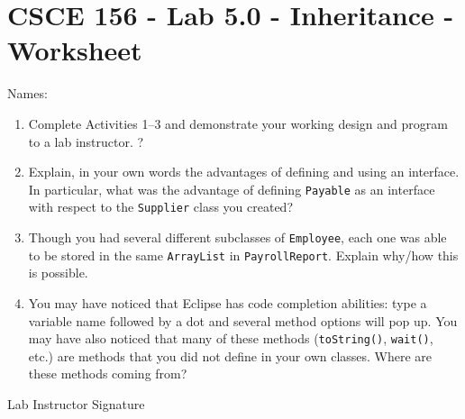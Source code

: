 \documentclass[12pt]{scrartcl}
\begin{document}
\section*{CSCE 156 - Lab 5.0 - Inheritance - Worksheet}

Names: \underline{\hspace{10cm}}

\begin{enumerate}
  \item Complete Activities 1--3 and demonstrate your working design 
  and program to a lab instructor. 
  ?  \item Explain, in your own words the advantages of defining and using 
  an interface.  In particular, what was the advantage of defining 
  \texttt{Payable} as an interface with respect to the 
  \texttt{Supplier} class you created?

  \item Though you had several different subclasses of 
  \texttt{Employee}, each one was able to be stored in 
  the same \texttt{ArrayList} in \texttt{PayrollReport}.  
  Explain why/how this is possible. 
  
  \item You may have noticed that Eclipse has code completion abilities: 
  type a variable name followed by a dot and several method options will 
  pop up.  You may have also noticed that many of these methods 
  (\texttt{toString()}, \texttt{wait()}, etc.) 
  are methods that you did not define in your own classes.  
  Where are these methods coming from?  

\end{enumerate}

Lab Instructor Signature\underline{\hspace{7.5cm}}
\end{document}
